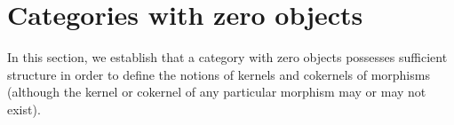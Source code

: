 

\section{Categories with zero objects}
\setcounter{theorem}{0}
\setcounter{equation}{0}


\renewcommand{\theenumi}{\roman{enumi}}
\renewcommand{\labelenumi}{\textnormal{(\theenumi)}$\;\;$}


In this section, we establish that a category with zero objects possesses sufficient structure
in order to define the notions of kernels and cokernels of morphisms
(although the kernel or cokernel of any particular morphism may or may not exist).


